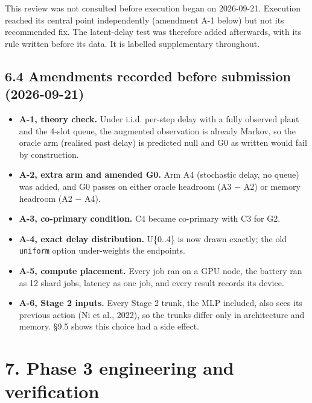 \documentclass[11pt]{article}
\begin{document}
This review was not consulted before execution began on 2026-09-21. Execution reached its central point independently (amendment A-1 below) but not its recommended fix. The latent-delay test was therefore added afterwards, with its rule written before its data. It is labelled supplementary throughout.



\subsection*{6.4 Amendments recorded before submission (2026-09-21)}



\begin{itemize}
\item \textbf{A-1, theory check.} Under i.i.d. per-step delay with a fully observed plant and the 4-slot queue, the augmented observation is already Markov, so the oracle arm (realised past delay) is predicted null and G0 as written would fail by construction.
\item \textbf{A-2, extra arm and amended G0.} Arm A4 (stochastic delay, no queue) was added, and G0 passes on either oracle headroom (A3 $-$ A2) or memory headroom (A2 $-$ A4).
\item \textbf{A-3, co-primary condition.} C4 became co-primary with C3 for G2.
\item \textbf{A-4, exact delay distribution.} U\{0..4\} is now drawn exactly; the old \texttt{uniform} option under-weights the endpoints.
\item \textbf{A-5, compute placement.} Every job ran on a GPU node, the battery ran as 12 shard jobs, latency as one job, and every result records its device.
\item \textbf{A-6, Stage 2 inputs.} Every Stage 2 trunk, the MLP included, also sees its previous action (Ni et al., 2022), so the trunks differ only in architecture and memory. \S{}9.5 shows this choice had a side effect.
\end{itemize}



\medskip



\section*{7. Phase 3 engineering and verification}
\end{document}
